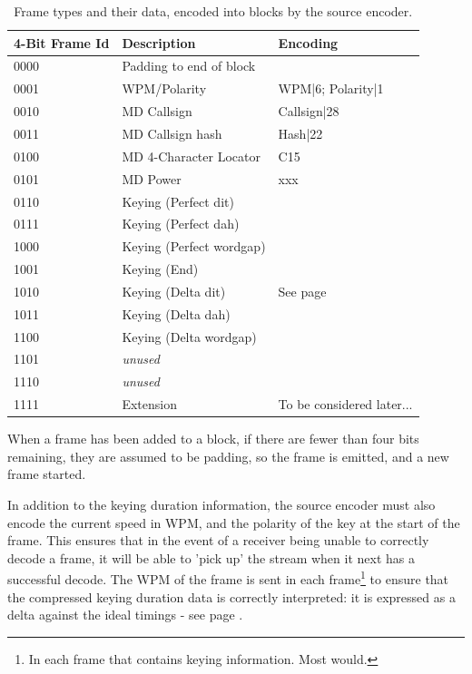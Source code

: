 \documentclass[a4paper]{tufte-handout}
\begin{document}
    \begin{table}[h]

        \selectfont
        \begin{tabular}{lll}
            \toprule
            4-Bit Frame Id & Description & Encoding \\
            \midrule
            0000 & Padding to end of block &  \\
            0001 & WPM/Polarity & WPM|6; Polarity|1 \\ 
            0010 & MD Callsign & Callsign|28 \\
            0011 & MD Callsign hash & Hash|22 \\
            0100 & MD 4-Character Locator & C15 \\
            0101 & MD Power & xxx \\
            0110 & Keying (Perfect dit) & \\
            0111 & Keying (Perfect dah) & \\
            1000 & Keying (Perfect wordgap) & \\
            1001 & Keying (End) & \\
            1010 & Keying (Delta dit) & See page \pageref{section:delta-encoding} \\
            1011 & Keying (Delta dah) & \\
            1100 & Keying (Delta wordgap) & \\
            1101 & \emph{unused} & \\
            1110 & \emph{unused} & \\
            1111 & Extension & To be considered later... \\
		\end{tabular}
		\caption{Frame types and their data, encoded into blocks by the source encoder.}
		\label{table:frame-types}
	\end{table}

When a frame has been added to a block, if there are fewer than four bits remaining, they are assumed to be padding, so the frame is emitted, and a new frame started.

In addition to the keying duration information, the source encoder must also encode the current speed in WPM, and the polarity of the key at the start of the frame. This ensures that in the event of a receiver being unable to correctly decode a frame, it will be able to 'pick up' the stream when it next has a successful decode. The WPM of the frame is sent in each frame\footnote{In each frame that contains keying information. Most would.} to ensure that the compressed keying duration data is correctly interpreted: it is expressed as a delta against the ideal timings - see page \pageref{section:delta-encoding}.
\end{document}
